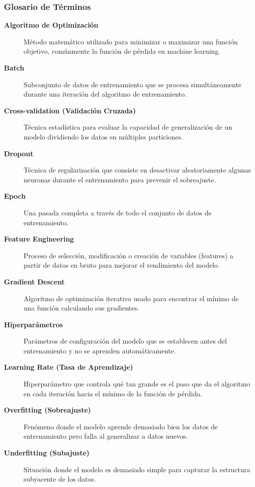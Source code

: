 \documentclass[11pt]{article} %
\begin{document}
\subsubsection{Glosario de Términos}
\begin{description}
    \item[\textbf{Algoritmo de Optimización}] Método matemático utilizado para minimizar o maximizar una función objetivo, comúnmente la función de pérdida en machine learning.
    
    \item[\textbf{Batch}] Subconjunto de datos de entrenamiento que se procesa simultáneamente durante una iteración del algoritmo de entrenamiento.
    
    \item[\textbf{Cross-validation (Validación Cruzada)}] Técnica estadística para evaluar la capacidad de generalización de un modelo dividiendo los datos en múltiples particiones.
    
    \item[\textbf{Dropout}] Técnica de regularización que consiste en desactivar aleatoriamente algunas neuronas durante el entrenamiento para prevenir el sobreajuste.
    
    \item[\textbf{Epoch}] Una pasada completa a través de todo el conjunto de datos de entrenamiento.
    
    \item[\textbf{Feature Engineering}] Proceso de selección, modificación o creación de variables (features) a partir de datos en bruto para mejorar el rendimiento del modelo.
    
    \item[\textbf{Gradient Descent}] Algoritmo de optimización iterativo usado para encontrar el mínimo de una función calculando sus gradientes.
    
    \item[\textbf{Hiperparámetros}] Parámetros de configuración del modelo que se establecen antes del entrenamiento y no se aprenden automáticamente.
    
    \item[\textbf{Learning Rate (Tasa de Aprendizaje)}] Hiperparámetro que controla qué tan grande es el paso que da el algoritmo en cada iteración hacia el mínimo de la función de pérdida.
    
    \item[\textbf{Overfitting (Sobreajuste)}] Fenómeno donde el modelo aprende demasiado bien los datos de entrenamiento pero falla al generalizar a datos nuevos.
    
    \item[\textbf{Underfitting (Subajuste)}] Situación donde el modelo es demasiado simple para capturar la estructura subyacente de los datos.
\end{description}
\end{document}
